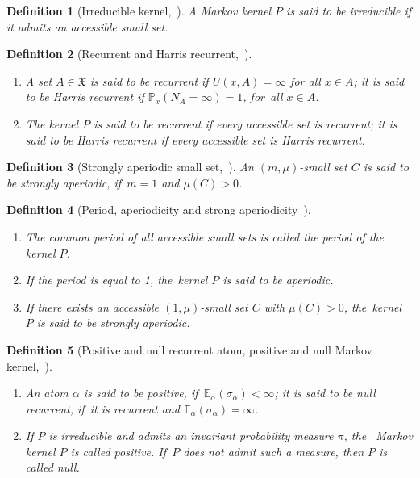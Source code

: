 \documentclass[11pt]{elsarticle}
\newtheorem{definition}{Definition}[section]
\def\P{\mathbb{P}}
\def\E{\mathbb{E}}
\begin{document}
\begin{definition}[Irreducible kernel,~\cite{DMPS18}]\label{irreducible} A Markov kernel $P$ is said to be   irreducible if it admits an accessible small set.
\end{definition}
\begin{definition}[Recurrent and Harris recurrent,~\cite{DMPS18}]
	\begin{enumerate}
		\item [(1)] A set $A\in\mathfrak{X}$ is said to be  recurrent if $U(x,A) = \infty$ for all $x\in A$; it is said to be  Harris recurrent if $\P_x(N_A=\infty)=1$, for~all $x\in A$.
		\item[(2)] The kernel $P$ is said to be  recurrent if every accessible set is recurrent; it is said to be  Harris recurrent if every accessible set is Harris recurrent.
	\end{enumerate}
\end{definition}
\begin{definition}[Strongly aperiodic small set,~\cite{DMPS18}] An $(m,\mu)$-small set $C$ is said to be  strongly aperiodic, if~$m=1$ and $\mu(C)>0$.
\end{definition}
\begin{definition}[Period, aperiodicity and strong aperiodicity~\cite{DMPS18}]\label{saKernal}
	\begin{enumerate}
		\item [(1)] The common period of all accessible small sets is called the period of the kernel $P$.
		\item [(2)] If the period is equal to 1, the~kernel $P$ is said to be  aperiodic.
		\item [(3)] If there exists an accessible $(1,\mu)$-small set $C$ with $\mu(C)>0$, the~kernel $P$ is said to be  strongly aperiodic.
	\end{enumerate}
\end{definition}
\begin{definition}[Positive and null recurrent atom, positive and null Markov kernel,~\cite{DMPS18}]\label{Def_P} 
	\begin{enumerate}
		\item[(1)] An atom $\alpha$ is said to be  positive, if~$\E_{\alpha}(\sigma_\alpha)<\infty$; it is said to be  null recurrent, if~it is recurrent and $\E_{\alpha}(\sigma_\alpha)=\infty$.
		\item[(2)] If $P$ is irreducible and admits an invariant probability measure $\pi$, the~		Markov kernel $P$ is called  positive. If~$P$ does not admit such a measure, then
		$P$ is called  null.
	\end{enumerate}
\end{definition}
\end{document}
